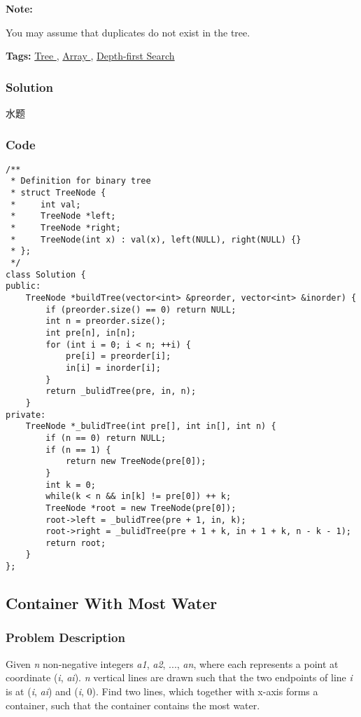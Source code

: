 \documentclass{article}
\begin{document}
\begin{CJK*}{UTF8}{gkai}
\textbf{Note:}


You may assume that duplicates do not exist in the tree.


\textbf{Tags: }
\hyperref[ Tree ]{ Tree },  \hyperref[ Array ]{ Array },  \hyperref[ Depth-first Search ]{ Depth-first Search }



\subsubsection*{Solution}
水题

\subsubsection*{Code}
\begin{lstlisting}
/**
 * Definition for binary tree
 * struct TreeNode {
 *     int val;
 *     TreeNode *left;
 *     TreeNode *right;
 *     TreeNode(int x) : val(x), left(NULL), right(NULL) {}
 * };
 */
class Solution {
public:
    TreeNode *buildTree(vector<int> &preorder, vector<int> &inorder) {
        if (preorder.size() == 0) return NULL;
        int n = preorder.size();
        int pre[n], in[n];
        for (int i = 0; i < n; ++i) {
            pre[i] = preorder[i];
            in[i] = inorder[i];
        }
        return _bulidTree(pre, in, n);
    }
private:
    TreeNode *_bulidTree(int pre[], int in[], int n) {
        if (n == 0) return NULL;
        if (n == 1) {
            return new TreeNode(pre[0]);
        }
        int k = 0;
        while(k < n && in[k] != pre[0]) ++ k;
        TreeNode *root = new TreeNode(pre[0]);
        root->left = _bulidTree(pre + 1, in, k);
        root->right = _bulidTree(pre + 1 + k, in + 1 + k, n - k - 1);
        return root;
    }
}; 
\end{lstlisting}


\subsection{ Container With Most Water }
\label{ Container With Most Water }

\subsubsection*{Problem Description}
Given \emph{n} non-negative integers \emph{a1}, \emph{a2}, ..., \emph{an}, where each represents a point at coordinate (\emph{i}, \emph{ai}). \emph{n} vertical lines are drawn such that the two endpoints of line \emph{i} is at (\emph{i}, \emph{ai}) and (\emph{i}, 0). Find two lines, which together with x-axis forms a container, such that the container contains the most water.


\end{CJK*}
\end{document}
